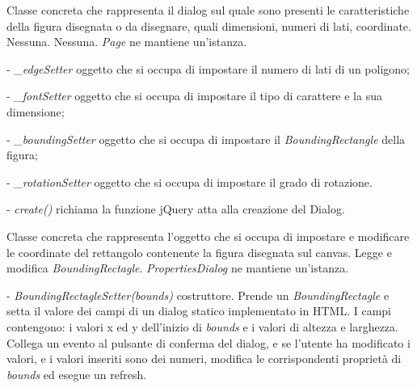 Classe concreta che rappresenta il dialog sul quale sono presenti le caratteristiche della figura disegnata o da disegnare, quali dimensioni, numeri di lati, coordinate.
Nessuna.
Nessuna.
\textit{Page} ne mantiene un'istanza.
\begin{elencopuntato}[\subsubsecindent]
\item[-] \textit{{\_}edgeSetter} oggetto che si occupa di impostare il numero di lati di un poligono;
\item[-] \textit{{\_}fontSetter} oggetto che si occupa di impostare il tipo di carattere e la sua dimensione;
\item[-] \textit{{\_}boundingSetter} oggetto che si occupa di impostare il \textit{BoundingRectangle} della figura;
\item[-] \textit{{\_}rotationSetter} oggetto che si occupa di impostare il grado di rotazione.
\end{elencopuntato}
\begin{elencopuntato}[\subsubsecindent]
\item[-] \textit{create()} richiama la funzione jQuery atta alla creazione del Dialog.
\end{elencopuntato}

Classe concreta che rappresenta l'oggetto che si occupa di impostare e modificare le coordinate del rettangolo contenente la figura disegnata sul canvas.
Legge e modifica \textit{BoundingRectagle}.
\textit{PropertiesDialog} ne mantiene un'istanza.
\begin{elencopuntato}[\subsubsecindent]
\item[-] \textit{BoundingRectagleSetter(bounds)} costruttore. Prende un \textit{BoundingRectagle} e setta il valore dei campi di un dialog statico implementato in HTML. I campi contengono: i valori x ed y dell'inizio di \textit{bounds} e i valori di altezza e larghezza. Collega un evento al pulsante di conferma del dialog, e se l'utente ha modificato i valori, e i valori inseriti sono dei numeri, modifica le corrispondenti propriet\`a di \textit{bounds} ed esegue un refresh.
\end{elencopuntato}

